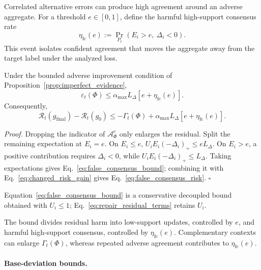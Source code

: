 Correlated alternative errors can produce high agreement around an adverse
aggregate. For a threshold $e\in[0,1]$, define the harmful high-support
consensus rate
\begin{equation}
\eta_{\mathrm{fc}}(e)
:=\Pr_{P_t}(E_i>e,\ \Delta_i<0).
\label{eq:false_consensus_rate}
\end{equation}
This event isolates confident agreement that moves the aggregate away from
the target label under the analyzed loss.

\begin{proposition}
\label{prop:false_consensus}
Under the bounded adverse improvement condition of
Proposition~\ref{prop:imperfect_evidence},
\begin{equation}
\varepsilon_t(\Phi)
\leq\alpha_{\max}L_\Delta
\left[e+\eta_{\mathrm{fc}}(e)\right].
\label{eq:false_consensus_bound}
\end{equation}
Consequently,
\begin{equation}
\mathcal R_t(g_{\mathrm{final}})-\mathcal R_t(g_0)
\leq-\Gamma_t(\Phi)
+\alpha_{\max}L_\Delta
\left[e+\eta_{\mathrm{fc}}(e)\right].
\label{eq:false_consensus_risk}
\end{equation}
\end{proposition}

\noindent\emph{Proof.}
Dropping the indicator of $\mathcal A_\Phi^c$ only enlarges the residual.
Split the remaining expectation at $E_i=e$.  On $E_i\leq e$,
$U_iE_i(-\Delta_i)_+\leq eL_\Delta$.  On $E_i>e$, a positive contribution
requires $\Delta_i<0$, while $U_iE_i(-\Delta_i)_+\leq L_\Delta$.
Taking expectations gives Eq.~\eqref{eq:false_consensus_bound}; combining it
with Eq.~\eqref{eq:changed_risk_gain} gives
Eq.~\eqref{eq:false_consensus_risk}. \hfill$\square$

Equation~\eqref{eq:false_consensus_bound} is a conservative decoupled bound
obtained with $U_i\leq1$; Eq.~\eqref{eq:repair_residual_terms} retains $U_i$.

The bound divides residual harm into low-support updates, controlled by
$e$, and harmful high-support consensus, controlled by
$\eta_{\mathrm{fc}}(e)$. Complementary contexts can enlarge
$\Gamma_t(\Phi)$, whereas repeated adverse agreement contributes to
$\eta_{\mathrm{fc}}(e)$.

\paragraph{Base-deviation bounds.}
\label{app:base-preservation}

